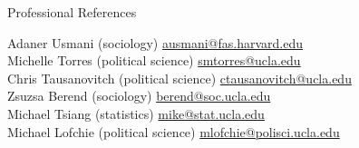 \documentclass[
	11pt, %
]{resume} %
\begin{document}

\begin{rSection}{Professional References}

Adaner Usmani (sociology) \hfill \href{mailto:ausmani@fas.harvard.edu}{ausmani@fas.harvard.edu}\\
Michelle Torres (political science) \hfill \href{mailto:smtorres@ucla.edu}{smtorres@ucla.edu}\\
Chris Tausanovitch (political science) \hfill \href{mailto:ctausanovitch@ucla.edu}{ctausanovitch@ucla.edu}\\
Zsuzsa Berend (sociology) \hfill \href{mailto:berend@soc.ucla.edu}{berend@soc.ucla.edu}\\
Michael Tsiang (statistics) \hfill \href{mailto:mike@stat.ucla.edu}{mike@stat.ucla.edu}\\
Michael Lofchie (political science) \hfill \href{mailto:mlofchie@polisci.ucla.edu}{mlofchie@polisci.ucla.edu}
\end{rSection}

\end{document}
